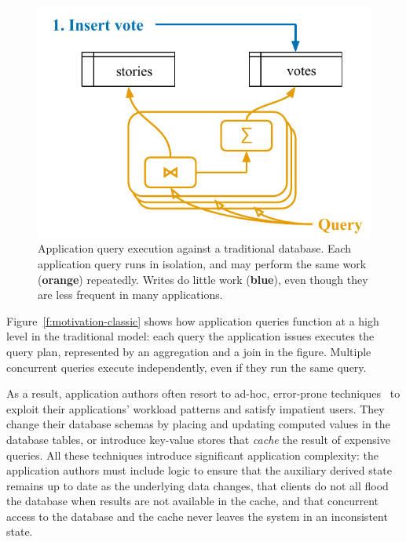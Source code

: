\begin{figure}
  \centering
  \includegraphics{diagrams/Motivation Classic DB.pdf}
  \caption{Application query execution against a traditional database. Each
  application query runs in isolation, and may perform the same work
  (\textbf{\color{set2}orange}) repeatedly. Writes do little work
  (\textbf{\color{set1}blue}), even though they are less frequent in many
  applications.}
  \label{f:motivation-classic}
\end{figure}

Figure~\vref{f:motivation-classic} shows how application queries function at a
high level in the traditional model: each query the application issues executes
the query plan, represented by an aggregation and a join in the figure. Multiple
concurrent queries execute independently, even if they run the same query.

As a result, application authors often resort to ad-hoc, error-prone
techniques~\cite{ad-hoc-caching} to exploit their applications' workload
patterns and satisfy impatient users. They change their database schemas by
placing and updating computed values in the database tables, or introduce
key-value stores that \textit{cache} the result of expensive queries. All these
techniques introduce significant application complexity: the application authors
must include logic to ensure that the auxiliary derived state remains up to date
as the underlying data changes, that clients do not all flood the database when
results are not available in the cache, and that concurrent access to the
database and the cache never leaves the system in an inconsistent state.

